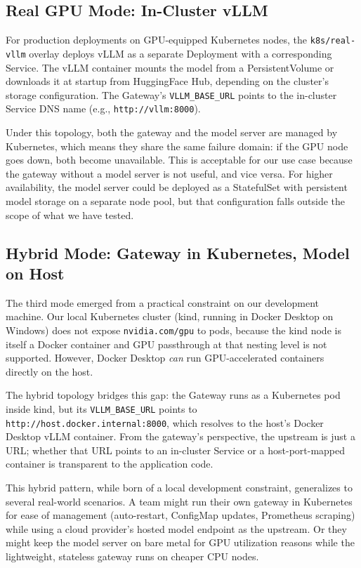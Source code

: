 \documentclass[10pt,journal]{IEEEtran}
\begin{document}
\subsection{Real GPU Mode: In-Cluster vLLM}

For production deployments on GPU-equipped Kubernetes nodes, the \texttt{k8s/real-vllm} overlay deploys vLLM as a separate Deployment with a corresponding Service. The vLLM container mounts the model from a PersistentVolume or downloads it at startup from HuggingFace Hub, depending on the cluster's storage configuration. The Gateway's \texttt{VLLM\_BASE\_URL} points to the in-cluster Service DNS name (e.g., \texttt{http://vllm:8000}).

Under this topology, both the gateway and the model server are managed by Kubernetes, which means they share the same failure domain: if the GPU node goes down, both become unavailable. This is acceptable for our use case because the gateway without a model server is not useful, and vice versa. For higher availability, the model server could be deployed as a StatefulSet with persistent model storage on a separate node pool, but that configuration falls outside the scope of what we have tested.

\subsection{Hybrid Mode: Gateway in Kubernetes, Model on Host}

The third mode emerged from a practical constraint on our development machine. Our local Kubernetes cluster (kind, running in Docker Desktop on Windows) does not expose \texttt{nvidia.com/gpu} to pods, because the kind node is itself a Docker container and GPU passthrough at that nesting level is not supported. However, Docker Desktop \emph{can} run GPU-accelerated containers directly on the host.

The hybrid topology bridges this gap: the Gateway runs as a Kubernetes pod inside kind, but its \texttt{VLLM\_BASE\_URL} points to \texttt{http://host.docker.internal:8000}, which resolves to the host's Docker Desktop vLLM container. From the gateway's perspective, the upstream is just a URL; whether that URL points to an in-cluster Service or a host-port-mapped container is transparent to the application code.

This hybrid pattern, while born of a local development constraint, generalizes to several real-world scenarios. A team might run their own gateway in Kubernetes for ease of management (auto-restart, ConfigMap updates, Prometheus scraping) while using a cloud provider's hosted model endpoint as the upstream. Or they might keep the model server on bare metal for GPU utilization reasons while the lightweight, stateless gateway runs on cheaper CPU nodes.
\end{document}
